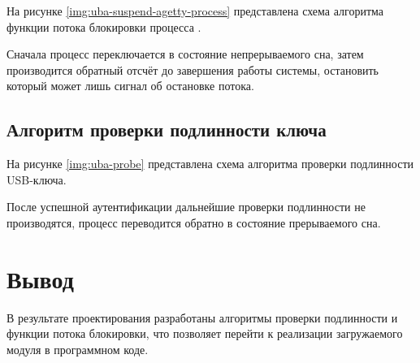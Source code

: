 На рисунке \ref{img:uba-suspend-agetty-process} представлена схема алгоритма функции потока блокировки процесса .

Сначала процесс  переключается в состояние непрерываемого сна, затем производится обратный отсчёт до завершения работы системы, остановить который может лишь сигнал об остановке потока.


\subsection{Алгоритм проверки подлинности ключа}

На рисунке \ref{img:uba-probe} представлена схема алгоритма проверки подлинности USB-ключа.

После успешной аутентификации дальнейшие проверки подлинности не производятся, процесс  переводится обратно в состояние прерываемого сна.


\section*{Вывод}

В результате проектирования разработаны алгоритмы проверки подлинности и функции потока блокировки, что позволяет перейти к реализации загружаемого модуля в программном коде.
